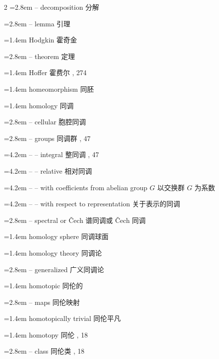 \begin{multicols}{2}
\noindent\hangindent=2.8em -- decomposition \quad 分解 \par
\noindent\hangindent=2.8em -- lemma \quad 引理 \par
\noindent\hangindent=1.4em Hodgkin \quad 霍奇金 \par
\noindent\hangindent=2.8em -- theorem \quad 定理 \par
\noindent\hangindent=1.4em Hoffer \quad 霍费尔 , 274\par
\noindent\hangindent=1.4em homeomorphism \quad 同胚 \par
\noindent\hangindent=1.4em homology \quad 同调 \quad\par
\noindent\hangindent=2.8em -- cellular \quad 胞腔同调 \par
\noindent\hangindent=2.8em -- groups \quad 同调群 , 47\par
\noindent\hangindent=4.2em -- -- integral \quad 整同调 , 47\par
\noindent\hangindent=4.2em -- -- relative \quad 相对同调 \par
\noindent\hangindent=4.2em -- -- with coefficients from abelian group $G$ \quad 以交换群 $G$ 为系数 \par
\noindent\hangindent=4.2em -- -- with respect to representation \quad 关于表示的同调 \par
\noindent\hangindent=2.8em -- spectral or \v{C}ech \quad 谱同调或 \v{C}ech 同调 \par
\noindent\hangindent=1.4em homology sphere \quad 同调球面 \par
\noindent\hangindent=1.4em homology theory \quad 同调论 \quad\par
\noindent\hangindent=2.8em -- generalized \quad 广义同调论 \par
\noindent\hangindent=1.4em homotopic \quad 同伦的 \quad\par
\noindent\hangindent=2.8em -- maps \quad 同伦映射 \par
\noindent\hangindent=1.4em homotopically trivial \quad 同伦平凡 \par
\noindent\hangindent=1.4em homotopy \quad 同伦 , 18\par
\noindent\hangindent=2.8em -- class \quad 同伦类 , 18\par

\end{multicols}
